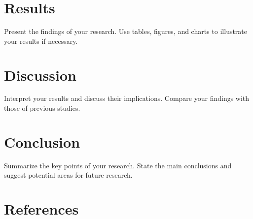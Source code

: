 \documentclass[12pt,a4paper]{article}
\begin{document}
\section{Results}
Present the findings of your research. Use tables, figures, and charts to illustrate your results if necessary.

\section{Discussion}
Interpret your results and discuss their implications. Compare your findings with those of previous studies.

\section{Conclusion}
Summarize the key points of your research. State the main conclusions and suggest potential areas for future research.

\section*{References}



\end{document}
